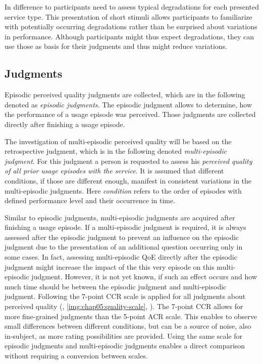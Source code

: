In difference to \citet{moller_single-call_2011} participants need to assess typical degradations for each presented service type.
This presentation of short stimuli allows participants to familiarize with potentially occurring degradations rather than be surprised about variations in performance.
Although participants might thus expect degradations, they can use those as basis for their judgments and thus might reduce variations.

\subsection{Judgments}
Episodic perceived quality judgments are collected, which are in the following denoted as \emph{episodic judgments}.
The episodic judgment allows to determine, how the performance of a usage episode was perceived.
Those judgments are collected directly after finishing a usage episode.

The investigation of multi-episodic perceived quality will be based on the retrospective judgment, which is in the following denoted \emph{multi-episodic judgment}.
For this judgment a person is requested to assess his \emph{perceived quality of all prior usage episodes with the service}.
It is assumed that different conditions, if those are different enough, manifest in consistent variations in the multi-episodic judgments.
Here \emph{condition} refers to the order of episodes with defined performance level and their occurrence in time.

Similar to episodic judgments, multi-episodic judgments are acquired after finishing a usage episode.
If a multi-episodic judgment is required, it is always assessed after the episodic judgment to prevent an influence on the episodic judgment due to the presentation of an additional question occurring only in some cases.
In fact, assessing multi-episodic \ac{QoE} directly after the episodic judgment might increase the impact of the this very episode on this multi-episodic judgment.
However, it is not yet known, if such an effect occurs and how much time should be between the episodic judgment and multi-episodic judgment.
Following \citet{moller_single-call_2011} the 7-point \ac{CCR} scale is applied for all judgments about perceived quality (\cf, \autoref{img:chap05:quality-scale}, ).
The 7-point \ac{CCR} allows for more fine-grained judgments than the 5-point \ac{ACR} scale.
This enables to observe small differences between different conditions, but can be a source of noise, also in-subject, as more rating possibilities are provided.
Using the same scale for episodic judgments and multi-episodic judgments enables a direct comparison without requiring a conversion between scales.

